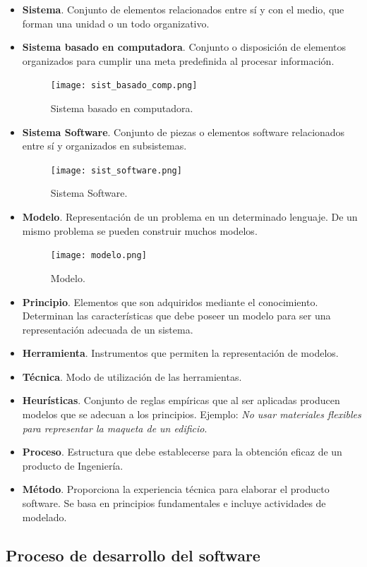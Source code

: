 \documentclass[12pt,spanish]{article}
\begin{document}
\begin{itemize}
	\item \textbf{Sistema}. Conjunto de elementos relacionados entre sí y con el medio, que forman una unidad o un todo organizativo.
	\item \textbf{Sistema basado en computadora}. Conjunto o disposición de elementos organizados para cumplir una meta predefinida al procesar información.
		\begin{figure}[H]
		\centering
		\texttt{[image: sist\_basado\_comp.png]}
		\caption{Sistema basado en computadora.}
		\end{figure}
	\item \textbf{Sistema Software}. Conjunto de piezas o elementos software relacionados entre sí y organizados en subsistemas.
		\begin{figure}[H]
		\centering
		\texttt{[image: sist\_software.png]}
		\caption{Sistema Software.}
		\end{figure}
	\item \textbf{Modelo}. Representación de un problema en un determinado lenguaje. De un mismo problema se pueden construir muchos modelos.
		\begin{figure}[H]
		\centering
		\texttt{[image: modelo.png]}
		\caption{Modelo.}
		\end{figure}
	\item \textbf{Principio}. Elementos que son adquiridos mediante el conocimiento. Determinan las características que debe poseer un modelo para ser una representación adecuada de un sistema.
	\item \textbf{Herramienta}. Instrumentos que permiten la representación de modelos.
	\item \textbf{Técnica}. Modo de utilización de las herramientas.
	\item \textbf{Heurísticas}. Conjunto de reglas empíricas que al ser aplicadas producen modelos que se adecuan a los principios. Ejemplo: \textit{No usar materiales flexibles para representar la maqueta de un edificio}.
	\item \textbf{Proceso}. Estructura que debe establecerse para la obtención eficaz de un producto de Ingeniería.
	\item \textbf{Método}. Proporciona la experiencia técnica para elaborar el producto software. Se basa en principios fundamentales e incluye actividades de modelado.
	
\end{itemize}

\subsection{Proceso de desarrollo del software}
\end{document}
